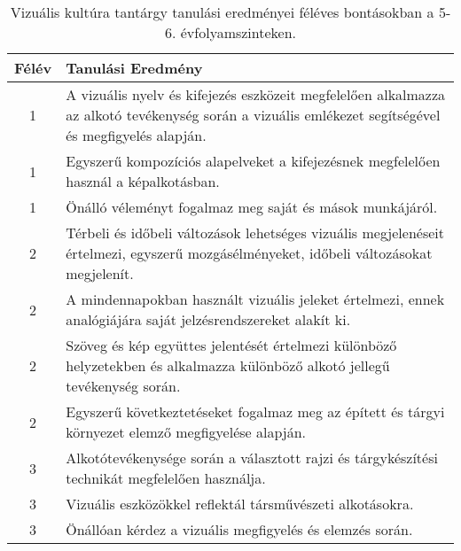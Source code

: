        
           \begin{longtable}{c | p{} }
            \caption[Vizuális kultúra 5-6.]{Vizuális kultúra tantárgy tanulási eredményei féléves bontásokban a 5-6. évfolyamszinteken. }  \\

            \textbf{Félév} & \textbf{Tanulási Eredmény} \\
            \hline
            \endhead
                                
                                          1 &  A vizuális nyelv és kifejezés eszközeit megfelelően alkalmazza az alkotó tevékenység során a vizuális emlékezet segítségével és megfigyelés alapján. \\ \hline
                                          1 &  Egyszerű kompozíciós alapelveket a kifejezésnek megfelelően használ a képalkotásban. \\ \hline
                                          1 &  Önálló véleményt fogalmaz meg saját és mások munkájáról. \\ \hline
                                      
                                
                                          2 &  Térbeli és időbeli változások lehetséges vizuális megjelenéseit értelmezi, egyszerű mozgásélményeket, időbeli változásokat megjelenít. \\ \hline
                                          2 &  A mindennapokban használt vizuális jeleket értelmezi, ennek analógiájára saját jelzésrendszereket alakít ki. \\ \hline
                                          2 &  Szöveg és kép együttes jelentését értelmezi különböző helyzetekben és alkalmazza különböző alkotó jellegű tevékenység során. \\ \hline
                                          2 &  Egyszerű következtetéseket fogalmaz meg az épített és tárgyi környezet elemző megfigyelése alapján. \\ \hline
                                      
                                
                                          3 &  Alkotótevékenysége során a választott rajzi és tárgykészítési technikát megfelelően használja. \\ \hline
                                          3 &  Vizuális eszközökkel reflektál társművészeti alkotásokra. \\ \hline
                                          3 &  Önállóan kérdez a vizuális megfigyelés és elemzés során. \\ \hline
                                      

\end{longtable}
